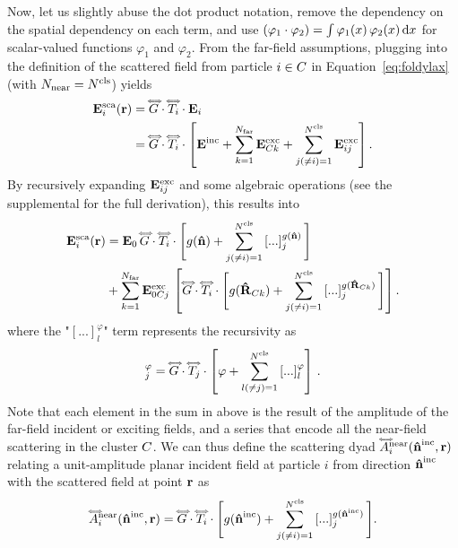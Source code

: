 Now, let us slightly abuse the dot product notation, remove the dependency on the spatial dependency on each term, and use $(\varphi_1 \cdot \varphi_2) = \int \varphi_1(x)\,\varphi_2(x) \,\text{d}x$ for scalar-valued functions $\varphi_1$ and $\varphi_2$. From the far-field assumptions, plugging  into the definition of the scattered field from particle $i\in C$ in Equation~\eqref{eq:foldylax} (with ${N_{\text{near}}}={N^\text{cls}}$) yields
%
\begin{equation}
    \label{eq:scafieldcluster1}
    \begin{split}
        \mathbf{E}^\text{sca}_i(\mathbf{r}) &= \accentset{\Longleftrightarrow}{G} \cdot \accentset{\Longleftrightarrow}{T}_i\cdot \mathbf{E}_i\\
        & = \accentset{\Longleftrightarrow}{G} \cdot \accentset{\Longleftrightarrow}{T}_i \cdot \left[\mathbf{E}^\text{inc} + \sum_{k=1}^{N_{\text{far}}} \mathbf{E}^\text{exc}_{C k}+ \sum_{j(\neq i)=1}^{N^\text{cls}} \mathbf{E}^\text{exc}_{ij} \right].
    \end{split}        
\end{equation}
%
By recursively expanding $\mathbf{E}^\text{exc}_{ij}$ and some algebraic operations (see the supplemental for the full derivation), this results into 
\begin{align}
    \label{eq:scafieldcluster5}
    \mathbf{E}^\text{sca}_i(\mathbf{r}) &= \mathbf{E}_0 \, \accentset{\Longleftrightarrow}{G} \cdot \accentset{\Longleftrightarrow}{T}_i \cdot \Bigg[ g(\mathbf{\hat{n}}) + \sum_{j(\neq i)=1}^{N^\text{cls}} \left[...\right]_j^{g(\mathbf{\hat{n}})} \Bigg] \\
    & + \sum_{k=1}^{N_{\text{far}}} \mathbf{E}^\text{exc}_{0C j}\,\left[ \accentset{\Longleftrightarrow}{G} \cdot \accentset{\Longleftrightarrow}{T}_i \cdot \Bigg[ g(\mathbf{\hat{R}}_{C k}) + \sum_{j(\neq i)=1}^{N^\text{cls}} \left[...\right]_j^{g(\mathbf{\hat{R}}_{C k})}\Bigg]\right]. \nonumber 
\end{align}
%
where the "$[...]_l^\varphi$" term represents the recursivity as
%
\begin{equation}
    [...]_j^\varphi= \sGreen \cdot \dyad{T}_j \cdot \left[\varphi + \sum_{l(\neq j)=1}^\Ncls \left[...\right]_l^\varphi\right] \,.
\end{equation}
%
Note that each element in the sum in  above is the result of the amplitude of the far-field incident or exciting fields, and a series that encode all the near-field scattering in the cluster $C$. We can thus define the scattering dyad $\accentset{\Longleftrightarrow}{A}_i^\text{near}(\mathbf{\hat{n}}^{\text{inc}},\mathbf{r})$ relating a unit-amplitude planar incident field at particle $i$ from direction $\mathbf{\hat{n}}^{\text{inc}}$ with the scattered field at point $\mathbf{r}$ as
%
\begin{equation}
    \accentset{\Longleftrightarrow}{A}_i^\text{near}(\mathbf{\hat{n}}^{\text{inc}},\mathbf{r}) = \accentset{\Longleftrightarrow}{G} \cdot \accentset{\Longleftrightarrow}{T}_i\cdot \Bigg[ g(\mathbf{\hat{n}}^{\text{inc}}) + \sum_{j(\neq i)=1}^{N^\text{cls}} \left[...\right]_j^{g(\mathbf{\hat{n}}^{\text{inc}})} \Bigg].
    \label{eq:scatdyad_near}
\end{equation}

